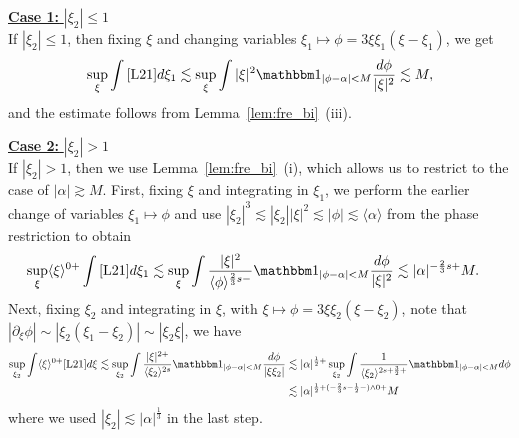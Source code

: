 \documentclass[%
11pt,  reqno]{amsart}
\newcommand{\5}{\textup{V}}
\newcommand{\noi}{\noindent}
\newcommand{\ind}{\mathbbm 1}
\newcommand{\les}{\lesssim}
\theoremstyle{remark}
\newcommand{\al}{\alpha}
\newcommand{\ges}{\gtrsim}
\newcommand{\jb}[1]
{\langle #1 \rangle}
\numberwithin{equation}{section}
\numberwithin{theorem}{section}
\begin{document}
\smallskip

\noi\underline{\textbf{Case 1:} $|\xi_2| \le 1$}\\
If $|\xi_2| \le 1$, then fixing $\xi$ and changing variables $\xi_1 \mapsto \phi = 3 \xi\xi_1(\xi-\xi_1)$, we get
\begin{align}
    \sup_\xi \int \eqref{L21} d\xi_1
    \les \sup_\xi \int |\xi|^2 \ind_{|\phi - \al| < M } \frac{d\phi}{|\xi|^2 } \les M , 
\end{align}
and the estimate follows from Lemma~\ref{lem:fre_bi}~(iii).

\smallskip 

\noi\underline{\textbf{Case 2:} $|\xi_2| > 1$}\\
If $|\xi_2| >1$, then we use Lemma~\ref{lem:fre_bi}~(i), which allows us to restrict to the case of $|\al| \ges M$. 
First, fixing $\xi$ and integrating in $\xi_1$, we perform the earlier change of variables $\xi_1 \mapsto \phi$ and use $|\xi_2|^3 \les |\xi_2| |\xi|^2 \les |\phi| \les \jb{\al}$ from the phase restriction to obtain
\begin{align}
    \sup_{\xi} \jb{\xi}^{0+}\int \eqref{L21} d\xi_1
    &
    \les 
    \sup_\xi 
    \int \frac{|\xi|^{2}}{\jb{\phi}^{\frac23s-}} \ind_{|\phi-\al| < M} \frac{d\phi}{|\xi|^2} 
    \les |\al|^{-\frac23 s+} M . 
\end{align}
Next, fixing $\xi_2$ and integrating in $\xi$, with $\xi \mapsto \phi = 3\xi \xi_2 (\xi-\xi_2)$, note that $|\partial_\xi \phi| \sim |\xi_2 (\xi_1-\xi_2)| \sim |\xi_2 \xi|$, we have
\begin{align}
\sup_{\xi_2} \int \jb{\xi}^{0+} \eqref{L21} d\xi 
\les \sup_{\xi_2} \int \frac{|\xi|^{2+}}{\jb{\xi_2}^{2s}} \ind_{|\phi-\al| < M} \frac{d\phi}{|\xi\xi_2|} 
&
\les 
|\al|^{\frac12+}
\sup_{\xi_2} \int \frac{1}{\jb{\xi_2}^{2s+\frac32+}} \ind_{|\phi-\al| < M } d\phi
\\
&
\les
|\al|^{\frac12 + (-\frac23 s - \frac12 -) \land 0 
+ } M
\end{align}
where we used $|\xi_2| \les |\al|^{\frac13}$ in the last step. 
\end{document}
